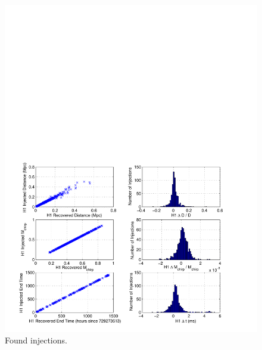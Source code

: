 \begin{figure}[p]
\begin{center}
\includegraphics[width=\textwidth]{figures/result/h1_param_error}
\end{center}
\caption{\label{f:h1_param_error}%
Found injections.
}
\end{figure}

